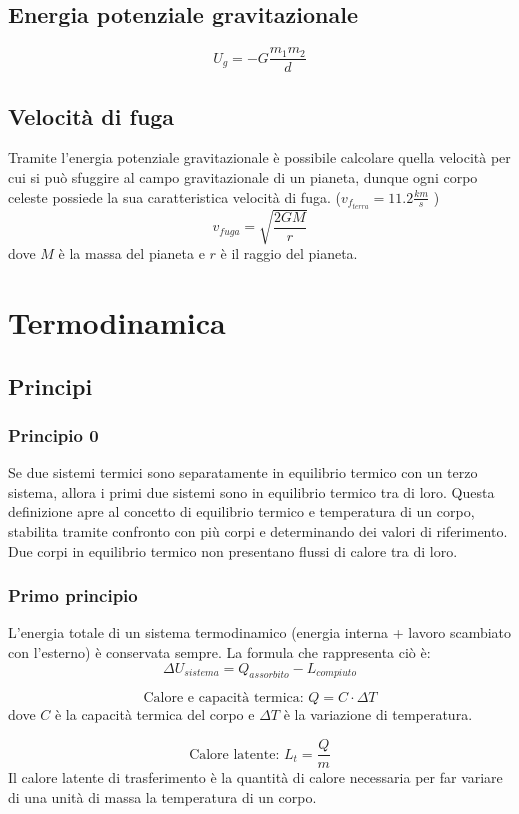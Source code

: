 \documentclass[a4paper]{article}
\theoremstyle{break}
\theoremstyle{break}
\theoremstyle{break}
\theoremstyle{break}
\begin{document}
\subsection{Energia potenziale gravitazionale}
\[
  U_g = -G \frac{m_1 m_2}{d}
\] 

\subsection{Velocità di fuga}
Tramite l’energia potenziale gravitazionale è possibile calcolare quella velocità
per cui si può sfuggire al campo gravitazionale di un pianeta, dunque ogni
corpo celeste possiede la sua caratteristica velocità di fuga. (\( v_{f_{terra}} = 11.2 \frac{km}{s} \) )
\[
  v_{fuga} = \sqrt{\frac{2 G M}{r}}
\] 
dove \( M \) è la massa del pianeta e \( r \) è il raggio del pianeta.

\section{Termodinamica}
\subsection{Principi}
\subsubsection{Principio 0}
Se due sistemi termici sono separatamente in equilibrio termico con un terzo sistema, allora i primi
due sistemi sono in equilibrio termico tra di loro. Questa definizione apre al concetto di equilibrio
termico e temperatura di un corpo, stabilita tramite confronto con più corpi e determinando dei
valori di riferimento. Due corpi in equilibrio termico non presentano flussi di calore tra di loro.

\subsubsection{Primo principio}
L’energia totale di un sistema termodinamico (energia interna + lavoro scambiato con l’esterno) è
conservata sempre. La formula che rappresenta ciò è:
\[
  \Delta U_{sistema} = Q_{assorbito} - L_{compiuto}
\] 

\[
\text{Calore e capacità termica: } Q = C \cdot \Delta T
\] 
dove \( C \) è la capacità termica del corpo e \( \Delta T \) è la variazione di temperatura.

\[
  \text{Calore latente: } L_{t} = \frac{Q}{m}
\] 
Il calore latente di trasferimento è la quantità di calore necessaria per far
variare di una unità di massa la temperatura di un corpo.
\end{document}
